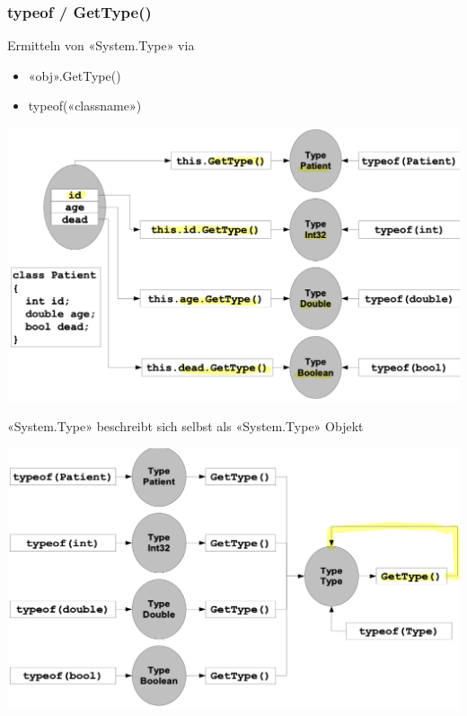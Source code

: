 \subsubsection{typeof / GetType()}
Ermitteln von «System.Type» via
\begin{itemize}
    \item «obj».GetType()
    \item typeof(«classname»)
\end{itemize}
\vspace{-8pt}
\begin{center}
    \includegraphics[scale=.35]{graphic/ref attr/typeof.png}
\end{center}
\vspace{-8pt}
«System.Type» beschreibt sich selbst als «System.Type» Objekt

\begin{center}
    \includegraphics[scale=.35]{graphic/ref attr/typeof2.png}
\end{center}
\vspace{-8pt}

